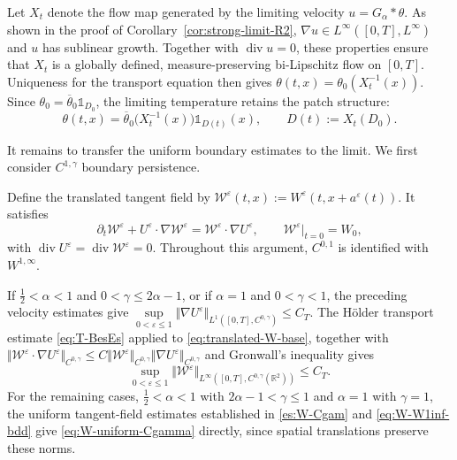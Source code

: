 \documentclass[reqno,11pt,a4paper]{amsart}
\begin{document}
Let $X_t$ denote the flow map generated by
the limiting velocity $u=G_\alpha*\theta$.
As shown in the proof of
Corollary~\ref{cor:strong-limit-R2},
$\nabla u\in L^\infty([0,T],L^\infty)$
and $u$ has sublinear growth.
Together with $\operatorname{div}u=0$,
these properties ensure that $X_t$ is a globally defined,
measure-preserving bi-Lipschitz flow on $[0,T]$.
Uniqueness for the transport equation then gives $\theta(t,x)=\theta_0(X_t^{-1}(x))$. 
Since $\theta_0=\overline\theta_0\mathds{1}_{D_0}$,
the limiting temperature retains the patch structure:
\begin{equation}\label{eq:limit-temperature-front}
  \theta(t,x)
  =
  \overline\theta_0\bigl(X_t^{-1}(x)\bigr)
  \mathds{1}_{D(t)}(x),
  \qquad D(t):=X_t(D_0).
\end{equation}

It remains to transfer the uniform boundary estimates
to the limit.
We first consider $C^{1,\gamma}$ boundary persistence.

Define the translated tangent field by  $\mathcal W^\varepsilon(t,x)
  :=W^\varepsilon(t,x+a^\varepsilon(t))$. 
It satisfies
\begin{equation}\label{eq:translated-W-base}
  \partial_t\mathcal W^\varepsilon
  +U^\varepsilon\cdot\nabla\mathcal W^\varepsilon
  =
  \mathcal W^\varepsilon\cdot\nabla U^\varepsilon,
  \qquad
  \mathcal W^\varepsilon|_{t=0}=W_0,
\end{equation}
with
$\operatorname{div}U^\varepsilon
=\operatorname{div}\mathcal W^\varepsilon=0$.
Throughout this argument,
$C^{0,1}$ is identified with $W^{1,\infty}$.

If $\frac12<\alpha<1$ and $0<\gamma\leq2\alpha-1$,
or if $\alpha=1$ and $0<\gamma<1$,
the preceding velocity estimates give $\sup\limits_{0<\varepsilon\leq1}
  \Vert \nabla U^\varepsilon\Vert _{L^1([0,T],C^{0,\gamma})}
  \leq C_T$. 
The H\"older transport estimate \eqref{eq:T-BesEs} applied to
\eqref{eq:translated-W-base}, together with
$\Vert \mathcal W^\varepsilon\cdot\nabla U^\varepsilon  \Vert _{C^{0,\gamma}}\leq C \Vert \mathcal W^\varepsilon\Vert _{C^{0,\gamma}} \Vert \nabla U^\varepsilon\Vert _{C^{0,\gamma}}$
and Gronwall's inequality gives
\begin{equation}\label{eq:W-uniform-Cgamma}
  \sup_{0<\varepsilon\leq1}
  \Vert \mathcal W^\varepsilon
    \Vert _{L^\infty([0,T],C^{0,\gamma}(\mathbb R^2))}
  \leq C_T.
\end{equation}
For the remaining cases,
$\frac12<\alpha<1$ with $2\alpha-1<\gamma\leq1$
and $\alpha=1$ with $\gamma=1$,
the uniform tangent-field estimates established
in \eqref{es:W-Cgam} and \eqref{eq:W-W1inf-bdd}
give \eqref{eq:W-uniform-Cgamma} directly,
since spatial translations preserve these norms.
\end{document}
